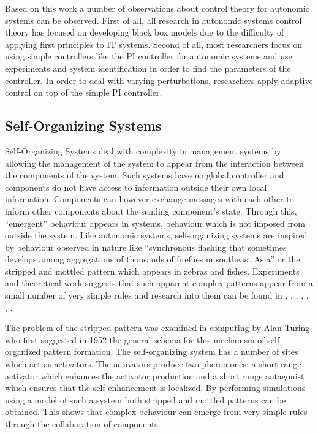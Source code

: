 Based on this work a number of observations about control theory for autonomic systems can be observed. First of all, all research in autonomic systems control theory has focused on developing black box models due to the difficulty of applying first principles to IT systems. Second of all, most researchers focus on using simple controllers like the PI controller for autonomic systems and use experiments and system identification in order to find the parameters of the controller. In order to deal with varying perturbations, researchers apply adaptive control on top of the simple PI controller.

\subsection{Self-Organizing Systems}

Self-Organizing Systems deal with complexity in management systems by allowing the management of the system to appear from the interaction between the components of the system. Such systems have no global controller and components do not have access to information outside their own local information. Components can however exchange messages with each other to inform other components about the sending component's state. Through this, ``emergent'' behaviour appears in systems, behaviour which is not imposed from outside the system. Like autonomic systems, self-organizing systems are inspired by behaviour observed in nature like ``synchronous flashing that sometimes develops among aggregations of thousands of fireflies in southeast Asia'' or the stripped and mottled pattern which appears in zebras and fishes. Experiments and theoretical work suggests that such apparent complex patterns appear from a small number of very simple rules and research into them can be found in \cite{related:selforganization-honeybee}, \cite{related:selforganization-autoscaling}, \cite{related:selforganization-autoscaling2}, \cite{related:selforganization-plant}, \cite{related:selforganization-healing1}, \cite{related:selforganization-healing2}, \cite{related:selforganization-energymanagement}.

The problem of the stripped pattern was examined in computing by Alan Turing who first suggested in 1952 the general schema for this mechanism of self-organized pattern formation. The self-organizing system has a number of sites which act as activators. The activators produce two pheromones: a short range activator which enhances the activator production and a short range antagonist which ensures that the self-enhancement is localized. By performing simulations using a model of such a system both stripped and mottled patterns can be obtained. This shows that complex behaviour can emerge from very simple rules through the collaboration of components.

